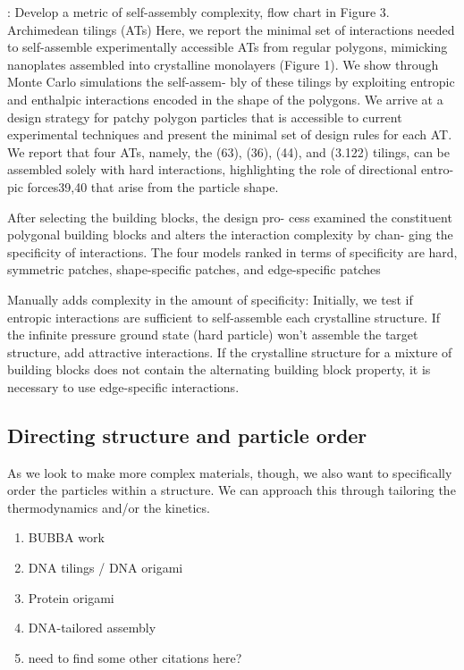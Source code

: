 \cite{Millan_2014_ACSNano}:
Develop a metric of self-assembly complexity, flow chart in Figure 3.
Archimedean tilings (ATs)
Here, we report the minimal set of interactions needed to self-assemble experimentally accessible ATs from regular polygons, mimicking nanoplates assembled into crystalline monolayers (Figure 1). We show through Monte Carlo simulations the self-assem- bly of these tilings by exploiting entropic and enthalpic interactions encoded in the shape of the polygons. We arrive at a design strategy for patchy polygon particles that is accessible to current experimental techniques and present the minimal set of design rules for each AT. We report that four ATs, namely, the (63), (36), (44), and (3.122) tilings, can be assembled solely with hard interactions, highlighting the role of directional entro- pic forces39,40 that arise from the particle shape.

After selecting the building blocks, the design pro- cess examined the constituent polygonal building blocks and alters the interaction complexity by chan- ging the specificity of interactions. The four models ranked in terms of specificity are hard, symmetric patches, shape-specific patches, and edge-specific patches

Manually adds complexity in the amount of specificity:
Initially, we test if entropic interactions are sufficient to self-assemble each crystalline structure. If the infinite pressure ground state (hard particle) won't assemble the target structure, add attractive interactions. If the crystalline structure for a mixture of building blocks does not contain the alternating building block property, it is necessary to use edge-specific interactions.


\subsection{Directing structure and particle order}
As we look to make more complex materials, though, we also want to specifically order the particles within a structure.
We can approach this through tailoring the thermodynamics and/or the kinetics.

\begin{enumerate}
\item BUBBA work
\item DNA tilings / DNA origami
\item Protein origami
\item DNA-tailored assembly
\item need to find some other citations here?
\end{enumerate}

